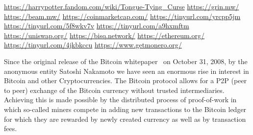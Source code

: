 \urldef\urlharrypotter\url{https://harrypotter.fandom.com/wiki/Tongue-Tying_Curse}
\urldef\urlgrin\url{https://grin.mw/}
\urldef\urlbeam\url{https://beam.mw/}
\urldef{\urlcoinmkt}\url{https://coinmarketcap.com/}
\urldef{\urlmtgox}\url{https://tinyurl.com/yrcpp5jm}
\urldef{\urlbitgrail}\url{https://tinyurl.com/5f8wkv7v}
\urldef{\urlquadriga}\url{https://tinyurl.com/a9hxmftm}
\urldef{\urluniswp}\url{https://uniswap.org/}
\urldef{\urlbisq}\url{https://bisq.network/}
\urldef{\urlethereum}\url{https://ethereum.org/}
\urldef{\urlgrinfund}\url{https://tinyurl.com/4jkbkccu}
\urldef{\urlmonero}\url{https://www.getmonero.org/}

Since the original release of the Bitcoin whitepaper~\cite{nakamoto2019bitcoin} on October 31, 2008, by the anonymous entity Satoshi Nakamoto we have seen an enormous rise in interest in Bitcoin and other Cryptocurrencies.
The Bitcoin protocol allows for a P2P (peer to peer) exchange of the Bitcoin currency without trusted intermediaries.
Achieving this is made possible by the distributed process of proof-of-work in which so-called miners compete in adding new transactions to the Bitcoin ledger for which they are rewarded by newly created currency as well as by transaction fees.

